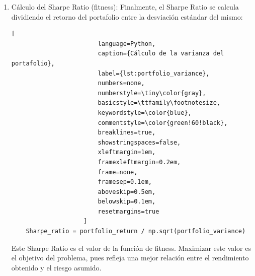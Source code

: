 \documentclass[9pt,a4paper,twoside]{rho-class/rho}
\begin{document}
\begin{enumerate}
                    \begin{lstlisting}[
                        language=Python,
                        caption={Cálculo de la varianza del portafolio},
                        label={lst:portfolio_variance},
                        numbers=none,
                        numberstyle=\tiny\color{gray},
                        basicstyle=\ttfamily\footnotesize,
                        keywordstyle=\color{blue},
                        commentstyle=\color{green!60!black},
                        breaklines=true,
                        showstringspaces=false,
                        xleftmargin=1em,
                        framexleftmargin=0.2em,
                        frame=none,
                        framesep=0.2em,
                        aboveskip=0.3em,
                        belowskip=0.2em,
                        resetmargins=true
                    ]
    portfolio_variance = np.dot(weights, np.dot(cov_matrix, weights))
                    \end{lstlisting}
                    La varianza es una medida del riesgo total del portafolio. La raíz cuadrada de esta varianza nos da la desviación estándar del portafolio, que representa el riesgo asumido al invertir en esta combinación de activos.
                
                \item Cálculo del Sharpe Ratio (fitness): Finalmente, el Sharpe Ratio se calcula dividiendo el retorno del portafolio entre la desviación estándar del mismo:        
                    \begin{lstlisting}[
                        language=Python,
                        caption={Cálculo de la varianza del portafolio},
                        label={lst:portfolio_variance},
                        numbers=none,
                        numberstyle=\tiny\color{gray},
                        basicstyle=\ttfamily\footnotesize,
                        keywordstyle=\color{blue},
                        commentstyle=\color{green!60!black},
                        breaklines=true,
                        showstringspaces=false,
                        xleftmargin=1em,
                        framexleftmargin=0.2em,
                        frame=none,
                        framesep=0.1em,
                        aboveskip=0.5em,
                        belowskip=0.1em,
                        resetmargins=true
                    ]
    Sharpe_ratio = portfolio_return / np.sqrt(portfolio_variance)
                    \end{lstlisting}
                    Este Sharpe Ratio es el valor de la función de fitness. Maximizar este valor es el objetivo del problema, pues refleja una mejor relación entre el rendimiento obtenido y el riesgo asumido.
            \end{enumerate}
\end{document}
